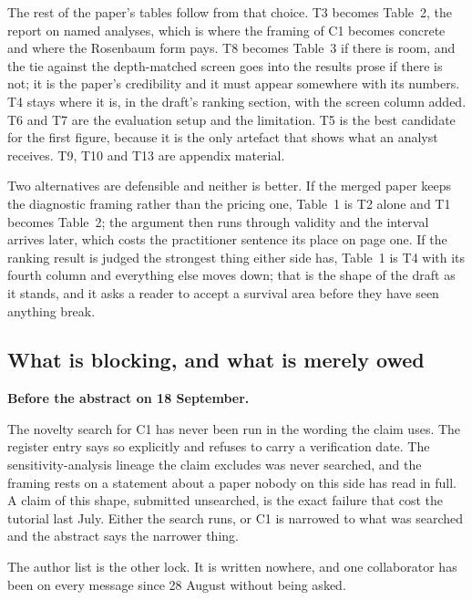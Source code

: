 The rest of the paper's tables follow from that choice. T3 becomes Table~2, the report on named
analyses, which is where the framing of C1 becomes concrete and where the Rosenbaum form pays. T8
becomes Table~3 if there is room, and the tie against the depth-matched screen goes into the
results prose if there is not; it is the paper's credibility and it must appear somewhere with its
numbers. T4 stays where it is, in the draft's ranking section, with the screen column added. T6 and
T7 are the evaluation setup and the limitation. T5 is the best candidate for the first figure,
because it is the only artefact that shows what an analyst receives. T9, T10 and T13 are appendix
material.

Two alternatives are defensible and neither is better. If the merged paper keeps the diagnostic
framing rather than the pricing one, Table~1 is T2 alone and T1 becomes Table~2; the argument then
runs through validity and the interval arrives later, which costs the practitioner sentence its
place on page one. If the ranking result is judged the strongest thing either side has, Table~1 is
T4 with its fourth column and everything else moves down; that is the shape of the draft as it
stands, and it asks a reader to accept a survival area before they have seen anything break.

\subsection{What is blocking, and what is merely owed}

\begin{blocking}
\textbf{Before the abstract on 18 September.}

The novelty search for C1 has never been run in the wording the claim uses. The register entry says
so explicitly and refuses to carry a verification date. The sensitivity-analysis lineage the claim
excludes was never searched, and the framing rests on a statement about a paper nobody on this side
has read in full. A claim of this shape, submitted unsearched, is the exact failure that cost the
tutorial last July. Either the search runs, or C1 is narrowed to what was searched and the abstract
says the narrower thing.

The author list is the other lock. It is written nowhere, and one collaborator has been on every
message since 28 August without being asked.
\end{blocking}


